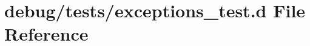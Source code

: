 \hypertarget{exceptions__test_8d}{
\section{debug/tests/exceptions\_\-test.d File Reference}
\label{exceptions__test_8d}
}
